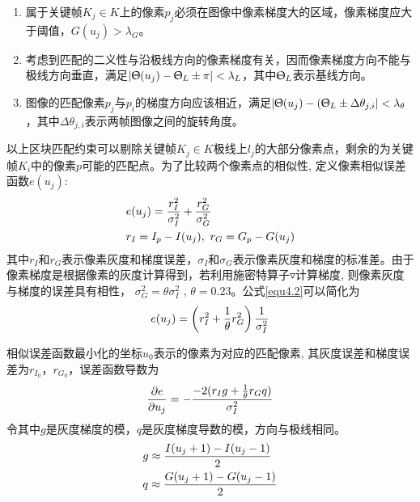 \begin{enumerate}[label={(\arabic*)}]

\item 属于关键帧$K_j \in K$上的像素$p_j$必须在图像中像素梯度大的区域，像素梯度应大于阈值，$G(u_j)> \lambda_G$。

\item 考虑到匹配的二义性与沿极线方向的像素梯度有关，因而像素梯度方向不能与极线方向垂直，满足$\vert \Uptheta(u_j)-\Uptheta_L \pm \pi \vert < \lambda_L$，其中$\Uptheta_L$表示基线方向。

\item 图像的匹配像素$p_j$与$p_i$的梯度方向应该相近，满足$\vert \Uptheta(u_j)-(\Uptheta_L \pm \Delta \theta_{j,i} \vert < \lambda_\theta $，其中$\Delta \theta_{j,i}$表示两帧图像之间的旋转角度。

\end{enumerate}
以上区块匹配约束可以剔除关键帧$K_j \in K$极线上$l_j$的大部分像素点，剩余的为关键帧$K_i$中的像素$p$可能的匹配点。为了比较两个像素点的相似性, 定义像素相似误差函数$e(u_j)$:
\begin{equation}
\label{equ4.2}
\begin{aligned}
& e(u_j) = {r_I^2 \over \sigma_I^2} + {r_G^2 \over \sigma_G^2} \\ 
& r_I = I_p-I(u_j),\  r_G = G_p-G(u_j)
\end{aligned}
\end{equation}
其中$r_I$和$r_G$表示像素灰度和梯度误差，$\sigma_I$和$\sigma_G$表示像素灰度和梯度的标准差。由于像素梯度是根据像素的灰度计算得到，若利用施密特算子$\triangledown$计算梯度, 则像素灰度与梯度的误差具有相性，
$\sigma_G^2=\theta \sigma_I^2$ , $ \theta = 0.23$。公式\ref{equ4.2}可以简化为
\begin{equation}
\label{equ4.3}
 e(u_j) = \left( {r_I^2}+{1 \over \theta} r_G^2 \right) {1 \over \sigma_I^2}
\end{equation} 

相似误差函数最小化的坐标$u_0$表示的像素为对应的匹配像素, 其灰度误差和梯度误差为$r_{I_0}$，$r_{G_0}$，误差函数导数为
\begin{equation}
\label{equ4.4}
{\partial e \over \partial u_j } = -{ -2(r_I g+ { 1 \over \theta} r_G q )  \over \sigma_I^2 }
\end{equation}
令其中$g$是灰度梯度的模，$q$是灰度梯度导数的模，方向与极线相同。
\begin{equation}
\label{equ4.5}
\begin{aligned}
& g \approx { {I(u_j+1) - I(u_j-1)} \over 2 } \\
& q \approx { {G(u_j+1) - G(u_j-1)} \over 2 } 
\end{aligned}
\end{equation}

